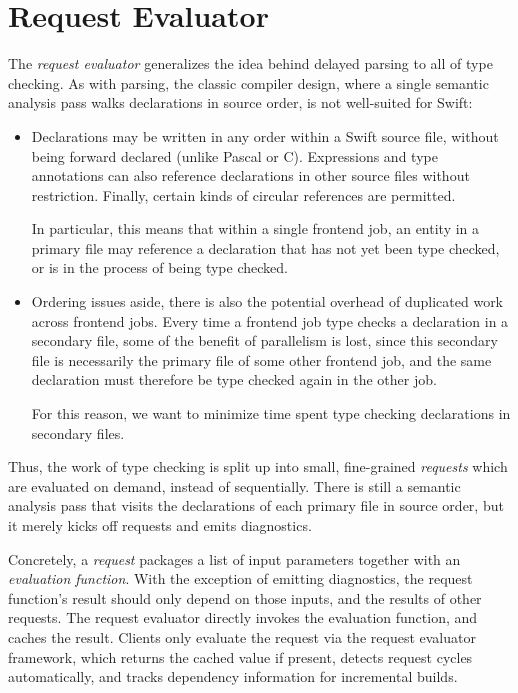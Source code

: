 \documentclass[../generics]{subfiles}
\begin{document}
\section{Request Evaluator}\label{request evaluator}

The \emph{request evaluator} generalizes the idea behind delayed parsing to all of type checking. As with parsing, the classic compiler design, where a single semantic analysis pass walks declarations in source order, is not well-suited for Swift:
\begin{itemize}
\item Declarations may be written in any order within a Swift source file, without being forward declared (unlike Pascal or C). Expressions and type annotations can also reference declarations in other source files without restriction. Finally, certain kinds of circular references are permitted.

In particular, this means that within a single frontend job, an entity in a primary file may reference a declaration that has not yet been type checked, or is in the process of being type checked.

\item Ordering issues aside, there is also the potential overhead of duplicated work across frontend jobs. Every time a frontend job type checks a declaration in a secondary file, some of the benefit of parallelism is lost, since this secondary file is necessarily the primary file of some other frontend job, and the same declaration must therefore be type checked again in the other job.

For this reason, we want to minimize time spent type checking declarations in secondary files.
\end{itemize}

Thus, the work of type checking is split up into small, fine-grained \emph{requests} which are evaluated on demand, instead of sequentially. There is still a semantic analysis pass that visits the declarations of each primary file in source order, but it merely kicks off requests and emits diagnostics.

Concretely, a \emph{request} packages a list of input parameters together with an \emph{evaluation function}. With the exception of emitting diagnostics, the request function's result should only depend on those inputs, and the results of other requests. The request evaluator directly invokes the evaluation function, and caches the result. Clients only evaluate the request via the request evaluator framework, which returns the cached value if present, detects request cycles automatically, and tracks dependency information for incremental builds.
\end{document}
